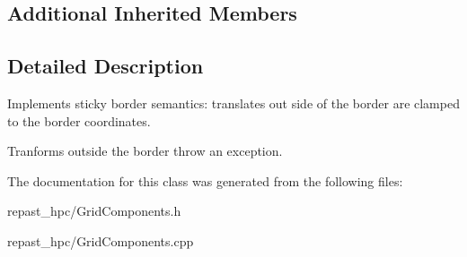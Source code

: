\subsection*{Additional Inherited Members}


\subsection{Detailed Description}
Implements sticky border semantics\-: translates out side of the border are clamped to the border coordinates. 

Tranforms outside the border throw an exception. 

The documentation for this class was generated from the following files\-:\begin{DoxyCompactItemize}
\item 
repast\-\_\-hpc/Grid\-Components.\-h\item 
repast\-\_\-hpc/Grid\-Components.\-cpp\end{DoxyCompactItemize}
